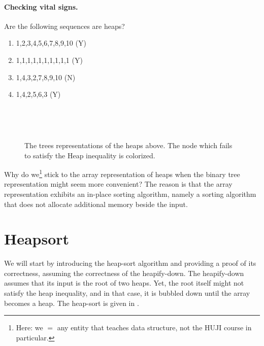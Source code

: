 \paragraph{Checking vital signs.}Are the following sequences are heaps? 
\begin{enumerate}
  \item 1,2,3,4,5,6,7,8,9,10 (Y)
  \item 1,1,1,1,1,1,1,1,1,1  (Y)
  \item 1,4,3,2,7,8,9,10     (N)
  \item 1,4,2,5,6,3	     (Y)
\end{enumerate}
\begin{figure}[h]
  \centering
  \begin{subfigure}[b]{0.9\textwidth}
  
  \end{subfigure}
  \\
  \begin{subfigure}[b]{0.45\textwidth}
	
  \end{subfigure}
\begin{subfigure}[b]{0.45\textwidth}
	
  \end{subfigure} 
  \\ 
\begin{subfigure}[b]{0.9\textwidth}
	
  \end{subfigure}
  \caption{The trees representations of the heaps above. The node which fails to satisfy the Heap inequality is colorized.}
\end{figure}

\begin{remark}
Why do we\footnote{Here: we $=$ any entity that teaches data structure, not the HUJI course in particular.} stick to the array representation of heaps when the binary tree representation might seem more convenient? The reason is that the array representation exhibits an in-place sorting algorithm, namely a sorting algorithm that does not allocate additional memory beside the input.
\end{remark} 


\section{Heapsort}
We will start by introducing the heap-sort algorithm and providing a proof of its correctness, assuming the correctness of the heapify-down. 
The heapify-down assumes that its input is the root of two heaps. Yet, the root itself might not satisfy the heap inequality, and in that case, it is bubbled down until the array becomes a heap. The heap-sort is given in .

